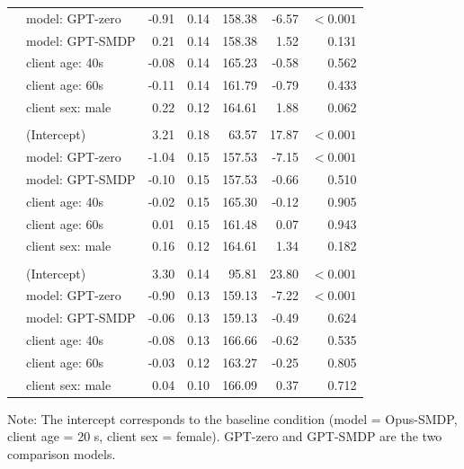 \documentclass{wiley-article}
\begin{document}
\begin{table}[htbp]
\begin{threeparttable}
\begin{tabular}{llrrrrr}
        & model: GPT-zero          & -0.91 & 0.14 & 158.38 &  -6.57 & $<\!0.001$ \\
        & model: GPT-SMDP           &  0.21 & 0.14 & 158.38 &   1.52 & 0.131 \\
        & client age: 40s                   & -0.08 & 0.14 & 165.23 &  -0.58 & 0.562 \\
        & client age: 60s                   & -0.11 & 0.14 & 161.79 &  -0.79 & 0.433 \\
        & client sex: male                  &  0.22 & 0.12 & 164.61 &   1.88 & 0.062 \\
      \addlinespace
      \multicolumn{7}{l}{\textbf{EMP}}\\
        & (Intercept)                       &  3.21 & 0.18 &  63.57 &  17.87 & $<\!0.001$ \\
        & model: GPT-zero          & -1.04 & 0.15 & 157.53 &  -7.15 & $<\!0.001$ \\
        & model: GPT-SMDP           & -0.10 & 0.15 & 157.53 &  -0.66 & 0.510 \\
        & client age: 40s                   & -0.02 & 0.15 & 165.30 &  -0.12 & 0.905 \\
        & client age: 60s                   &  0.01 & 0.15 & 161.48 &   0.07 & 0.943 \\
        & client sex: male                  &  0.16 & 0.12 & 164.61 &   1.34 & 0.182 \\
      \addlinespace
      \multicolumn{7}{l}{\textbf{OVR}}\\
        & (Intercept)                       &  3.30 & 0.14 &  95.81 &  23.80 & $<\!0.001$ \\
        & model: GPT-zero          & -0.90 & 0.13 & 159.13 &  -7.22 & $<\!0.001$ \\
        & model: GPT-SMDP           & -0.06 & 0.13 & 159.13 &  -0.49 & 0.624 \\
        & client age: 40s                   & -0.08 & 0.13 & 166.66 &  -0.62 & 0.535 \\
        & client age: 60s                   & -0.03 & 0.12 & 163.27 &  -0.25 & 0.805 \\
        & client sex: male                  &  0.04 & 0.10 & 166.09 &   0.37 & 0.712 \\
      \bottomrule
    \end{tabular}
    \begin{tablenotes}
      \scriptsize
      \item Note: The intercept corresponds to the baseline condition (model = Opus-SMDP, client age = 20 s, client sex = female). GPT-zero and GPT-SMDP are the two comparison models.
    \end{tablenotes}
  \end{threeparttable}
\end{table}
\end{document}
